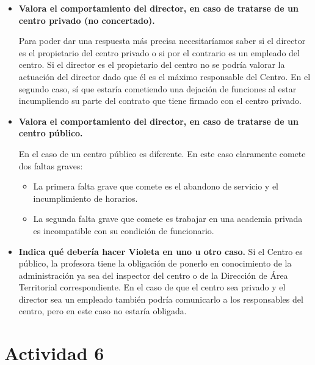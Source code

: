 \begin{itemize}
\item \textbf{Valora el comportamiento del director, en caso de tratarse de un centro privado (no concertado).}

Para poder dar una respuesta más precisa necesitaríamos saber si el director es el propietario del centro privado o si por el contrario es un empleado del centro. Si el director es el propietario del centro no se podría valorar la actuación del director dado que él es el máximo responsable del Centro. En el segundo caso, sí que estaría cometiendo una dejación de funciones al estar incumpliendo su parte del contrato que tiene firmado con el centro privado.


\item \textbf{Valora el comportamiento del director, en caso de tratarse de un centro público.}

En el caso de un centro público es diferente. En este caso claramente comete dos faltas graves:

\begin{itemize}
\item La primera falta grave que comete es el abandono de servicio y el incumplimiento de horarios.
\item La segunda falta grave que comete es trabajar en una academia privada es incompatible con su condición de funcionario.
\end{itemize}


\item \textbf{Indica qué debería hacer Violeta en uno u otro caso.}
Si el Centro es público, la profesora tiene la obligación de ponerlo en conocimiento de la administración ya sea del inspector del centro o de la Dirección de Área Territorial correspondiente.
%
En el caso de que el centro sea privado y el director sea un empleado también podría comunicarlo a los responsables del centro, pero en este caso no estaría obligada.

\end{itemize}


\section{Actividad 6}

